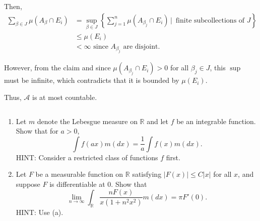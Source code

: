 \documentclass[12pt]{Homework}
\begin{document}
\begin{solution}
Then, \begin{align*}
    \sum_{\beta\in J}\mu(A_\beta\cap E_i)&=\sup_{\beta\in J}\left\{\sum_{j=1}^n\mu(A_{\beta_j}\cap E_i)\,|\,\text{ finite subcollections of }J\right\}\\
    &\le\mu(E_i)\\
    &<\infty\text{ since }A_{\beta_j}\text{ are disjoint}.
\end{align*}

However, from the claim and since $\mu(A_{\beta_j}\cap E_i)>0$ for all $\beta_j\in J$, this $\sup$ must be infinite, which contradicts that it is bounded by $\mu(E_i)$.

Thus, $\mathscr{A}$ is at most countable.
\end{solution}
\newpage

\begin{problem} $\,$
\begin{enumerate}[label=(\alph*)]
    \item Let $m$ denote the Lebesgue measure on $\mathbb{R}$ and let $f$ be an integrable function. Show that for $a>0$, $$\int f(ax)m(dx)=\frac{1}{a}\int f(x)m(dx).$$ HINT: Consider a restricted class of functions $f$ first.
    \item Let $F$ be a measurable function on $\mathbb{R}$ satisfying $|F(x)|\le C|x|$ for all $x$, and suppose $F$ is differentiable at $0$. Show that $$\lim_{n\to\infty}\int_\mathbb{R}\frac{nF(x)}{x(1+n^2x^2)}m(dx)=\pi F'(0).$$ HINT: Use (a).
\end{enumerate}
\end{problem}
\end{document}
